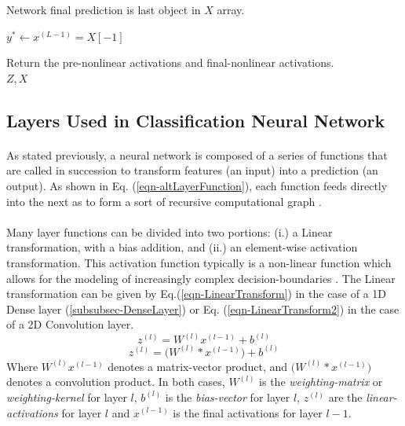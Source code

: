 \documentclass[12pt,letterpaper]{article}
\begin{document}
\begin{algorithm}[H]
\begin{algorithmic}
\item Network final prediction is last object in $X$ array.
\item $y^* \leftarrow x^{(L-1)} = X[-1]$
\item Return the pre-nonlinear activations and final-nonlinear activations.\\
\RETURN $Z , X$


\end{algorithmic}
\end{algorithm}




\subsection{Layers Used in Classification Neural Network}
\label{subsec-Layers}

\paragraph*{}As stated previously, a neural network is composed of a series of functions that are called in succession to transform features (an input) into a prediction (an output). As shown in Eq. (\ref{eqn-altLayerFunction}), each function feeds directly into the next as to form a sort of recursive computational graph \cite{Goodfellow}. 

\paragraph*{}Many layer functions can be divided into two portions: (i.) a Linear transformation, with a bias addition, and (ii.) an element-wise activation transformation. This activation function typically is a non-linear function which allows for the modeling of increasingly complex decision-boundaries \cite{Geron,Loy}. The Linear transformation can be given by Eq.(\ref{eqn-LinearTransform}) in the case of a 1D Dense layer (\ref{subsubsec-DenseLayer}) or Eq. (\ref{eqn-LinearTransform2}) in the case of a 2D Convolution layer.
\begin{equation}
\label{eqn-LinearTransform}
z^{(l)} = W^{(l)} x^{(l-1)} + b^{(l)}
\end{equation}
\begin{equation}
\label{eqn-LinearTransform2}
z^{(l)} = \big(W^{(l)} * x^{(l-1)}\big) + b^{(l)}
\end{equation} 
Where $W^{(l)} x^{(l-1)}$ denotes a matrix-vector product, and $\big(W^{(l)} * x^{(l-1)}\big)$ denotes a convolution product. In both cases, $W^{(l)}$ is the \textit{weighting-matrix} or \textit{weighting-kernel} for layer $l$, $b^{(l)}$ is the \textit{bias-vector} for layer $l$, $z^{(l)}$ are the \textit{linear-activations} for layer $l$ and $x^{(l-1)}$ is the final activations for layer $l-1$.
\end{document}
